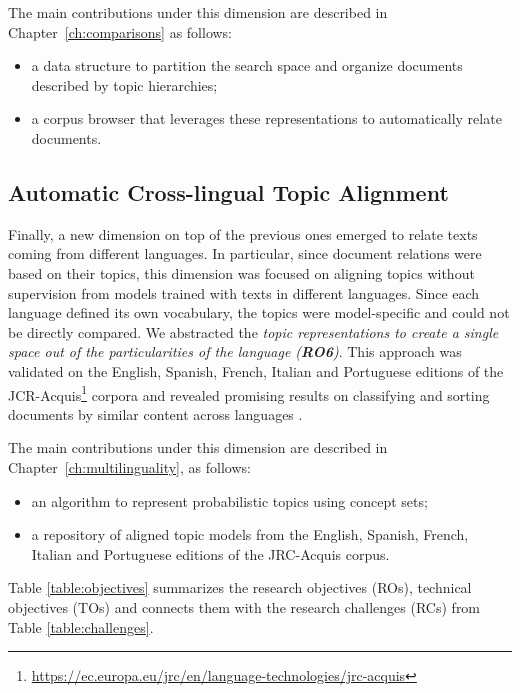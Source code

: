 The main contributions under this dimension are described in Chapter~\ref{ch:comparisons} as follows:
\begin{itemize}
\item a data structure to partition the search space and organize documents described by topic hierarchies;
\item a corpus browser that leverages these representations to automatically relate documents.
\end{itemize} 


\subsection{Automatic Cross-lingual Topic Alignment}

Finally, a new dimension on top of the previous ones emerged to relate texts coming from different languages. In particular, since document relations were based on their topics, this dimension was focused on aligning topics without supervision from models trained with texts in different languages. Since each language defined its own vocabulary, the topics were model-specific and could not be directly compared. We abstracted the \textit{topic representations to create a single space out of the particularities of the language (\textbf{RO6})}. This approach was validated on the English, Spanish, French, Italian and Portuguese editions of the JCR-Acquis\footnote{\url{https://ec.europa.eu/jrc/en/language-technologies/jrc-acquis}} corpora and revealed promising results on classifying and sorting documents by similar content across languages \citep{Badenes-Olmedo2019, Badenes-Olmedo2019b}. 

The main contributions under this dimension are described in Chapter~\ref{ch:multilinguality}, as follows: 
\begin{itemize}
\item an algorithm to represent probabilistic topics using concept sets;
\item a repository of aligned topic models from the English, Spanish, French, Italian and Portuguese editions of the JRC-Acquis corpus.
\end{itemize}

Table \ref{table:objectives} summarizes the research objectives (ROs), technical objectives (TOs) and connects them with the research challenges (RCs) from Table \ref{table:challenges}.



